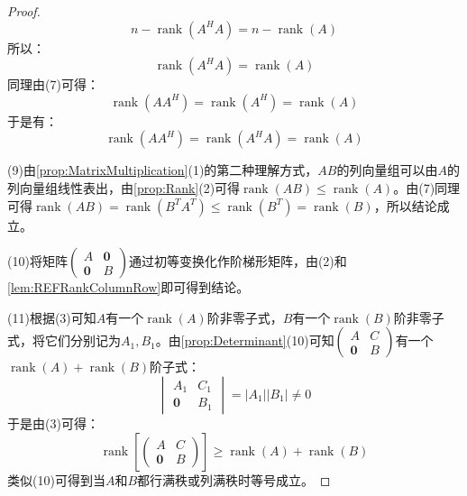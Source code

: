 \begin{proof}
	\begin{equation*}
		n-\operatorname{rank}(A^HA)=n-\operatorname{rank}(A)
	\end{equation*}
	所以：
	\begin{equation*}
		\operatorname{rank}(A^HA)=\operatorname{rank}(A)
	\end{equation*}
	同理由(7)可得：
	\begin{equation*}
		\operatorname{rank}(AA^H)=\operatorname{rank}(A^H)=\operatorname{rank}(A)
	\end{equation*}
	于是有：
	\begin{equation*}
		\operatorname{rank}(AA^H)=\operatorname{rank}(A^HA)=\operatorname{rank}(A)
	\end{equation*}\par
	(9)由\cref{prop:MatrixMultiplication}(1)的第二种理解方式，$AB$的列向量组可以由$A$的列向量组线性表出，由\cref{prop:Rank}(2)可得$\operatorname{rank}(AB)\leqslant\operatorname{rank}(A)$。由(7)同理可得$\operatorname{rank}(AB)=\operatorname{rank}(B^TA^T)\leqslant\operatorname{rank}(B^T)=\operatorname{rank}(B)$，所以结论成立。\par
	(10)将矩阵$\begin{pmatrix}
		A & \mathbf{0} \\
		\mathbf{0} & B
	\end{pmatrix}$通过初等变换化作阶梯形矩阵，由(2)和\cref{lem:REFRankColumnRow}即可得到结论。\par
	(11)根据(3)可知$A$有一个$\operatorname{rank}(A)$阶非零子式，$B$有一个$\operatorname{rank}(B)$阶非零子式，将它们分别记为$A_1,B_1$。由\cref{prop:Determinant}(10)可知$\begin{pmatrix}
		A & C \\
		\mathbf{0} & B
	\end{pmatrix}$有一个$\operatorname{rank}(A)+\operatorname{rank}(B)$阶子式：
	\begin{equation*}
		\begin{vmatrix}
			A_1 & C_1 \\
			\mathbf{0} & B_1
		\end{vmatrix}=|A_1||B_1|\ne0
	\end{equation*}
	于是由(3)可得：
	\begin{equation*}
		\operatorname{rank}\left[
		\begin{pmatrix}
			A & C \\
			\mathbf{0} & B
		\end{pmatrix}
		\right]\geqslant\operatorname{rank}(A)+\operatorname{rank}(B)
	\end{equation*}
	类似(10)可得到当$A$和$B$都行满秩或列满秩时等号成立。
\end{proof}

